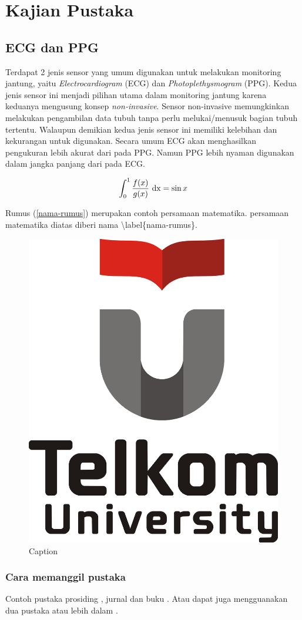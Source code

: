 \chapter{Kajian Pustaka}

\section{ECG dan PPG}
Terdapat 2 jenis sensor yang umum digunakan untuk melakukan monitoring jantung, yaitu \textit{Electrocardiogram} (ECG) dan \textit{Photoplethysmogram} (PPG). Kedua jenis sensor ini menjadi pilihan utama dalam monitoring jantung karena keduanya mengusung konsep \textit{non-invasive}. Sensor non-invasive memungkinkan melakukan pengambilan data tubuh tanpa perlu melukai/menusuk bagian tubuh tertentu. Walaupun demikian kedua jenis sensor ini memiliki kelebihan dan kekurangan untuk digunakan. Secara umum ECG akan menghasilkan pengukuran lebih akurat dari pada PPG. Namun PPG lebih nyaman digunakan dalam jangka panjang dari pada ECG.

\begin{equation}\label{nama-rumus}
    \int_0^1 \frac{f(x)}{g(x)}\ {\rm dx}=\sin x
\end{equation}

Rumus (\ref{nama-rumus}) merupakan contoh persamaan matematika. persamaan matematika diatas diberi nama \textbackslash label\{nama-rumus\}.

\begin{figure}[h!]
    \centering
    \includegraphics[scale=0.3]{Tel-U-Logo.png}
    \caption{Caption}
    \label{fig:my_label}
\end{figure}
\subsection{Cara memanggil pustaka}
Contoh pustaka prosiding \cite{doyen2014explicit}, jurnal \cite{gunawan2015hydrostatic} dan buku \cite{toro2013riemann}. Atau dapat juga mengguanakan dua pustaka atau lebih dalam \cite{gunawan2015hydrostatic,toro2013riemann}.